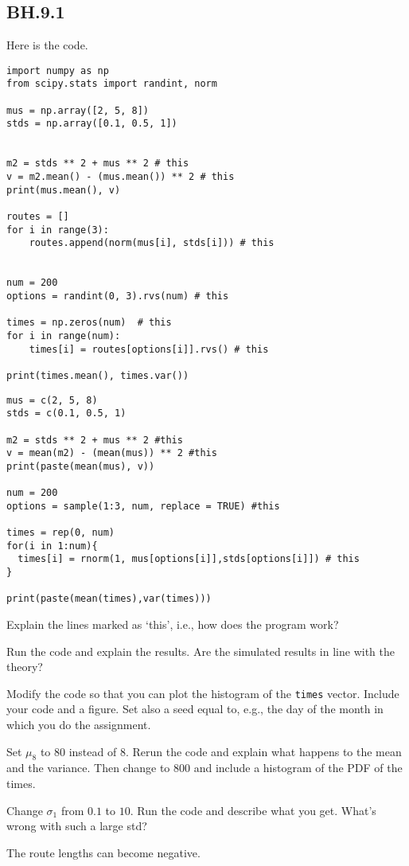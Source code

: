 \subsection{BH.9.1}
\label{sec:bh.9.1}

Here is the code.

\begin{verbatim}
import numpy as np
from scipy.stats import randint, norm

mus = np.array([2, 5, 8])
stds = np.array([0.1, 0.5, 1])


m2 = stds ** 2 + mus ** 2 # this
v = m2.mean() - (mus.mean()) ** 2 # this
print(mus.mean(), v)

routes = []
for i in range(3):
    routes.append(norm(mus[i], stds[i])) # this


num = 200
options = randint(0, 3).rvs(num) # this

times = np.zeros(num)  # this
for i in range(num):
    times[i] = routes[options[i]].rvs() # this

print(times.mean(), times.var())
\end{verbatim}

\begin{verbatim}
mus = c(2, 5, 8)
stds = c(0.1, 0.5, 1)

m2 = stds ** 2 + mus ** 2 #this
v = mean(m2) - (mean(mus)) ** 2 #this
print(paste(mean(mus), v))

num = 200
options = sample(1:3, num, replace = TRUE) #this

times = rep(0, num)
for(i in 1:num){
  times[i] = rnorm(1, mus[options[i]],stds[options[i]]) # this
}

print(paste(mean(times),var(times)))
\end{verbatim}

\begin{exercise}
Explain the lines marked as `this', i.e., how does the program work?
\end{exercise}

\begin{exercise}
Run the code and explain the results. Are the simulated results in line with the theory?
\end{exercise}

\begin{exercise}
Modify the code so that you can plot the histogram of the \verb|times| vector. Include your code and a figure. Set also a seed equal to, e.g.,  the day of the month in which you do the assignment.
\end{exercise}


\begin{exercise}
Set $\mu_8$ to 80 instead of $8$. Rerun the code and explain what happens to the mean and the variance. Then change to 800 and include a histogram of the PDF of the times.
\end{exercise}


\begin{exercise}
Change $\sigma_1$ from $0.1$ to $10$.  Run the code and describe what you get. What's wrong with such a large std?
\begin{solution}
The route lengths can become negative.
\end{solution}
\end{exercise}
